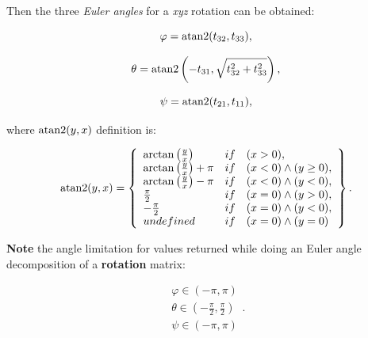         Then the three \textit{Euler angles} for a \textit{xyz} rotation
        can be obtained:

        \begin{equation}
            \varphi = \operatorname{atan2}(t_{32}, t_{33})
        ,\end{equation}

        \begin{equation}
            \theta = \operatorname{atan2} \left(-t_{31}, \sqrt{ t_{32}^{2} + t_{33}^{2}} \right)
        ,\end{equation}

        \begin{equation}
            \psi = \operatorname{atan2}(t_{21}, t_{11})
        ,\end{equation}

        where $\operatorname{atan2}(y, x)$ definition is:

        \begin{equation}
            \operatorname{atan2}(y, x) = \left\{
                \begin{array}{ll}
                    \arctan\left(\frac{y}{x}\right) & if \quad (x > 0),\\
                    \arctan\left(\frac{y}{x}\right) + \pi & if \quad (x < 0) \land (y \ge 0),\\
                    \arctan\left(\frac{y}{x}\right) - \pi & if \quad (x < 0) \land  (y < 0),\\
                    \frac{\pi}{2} & if \quad (x = 0) \land  (y > 0),\\
                    -\frac{\pi}{2} & if \quad (x = 0) \land  (y < 0),\\
                    undefined & if \quad (x = 0) \land (y = 0)
                \end{array}
            \right\}
        .\end{equation}

        \textbf{Note} the angle limitation for values returned while doing
        an Euler angle decomposition of a \textbf{rotation} matrix:

        \begin{equation}
            \begin{array}{l}
                \varphi \in (-\pi, \pi) \\
                \theta \in (-\frac{\pi}{2}, \frac{\pi}{2}) \\
                \psi \in (-\pi, \pi)
            \end{array}
        .\end{equation}

